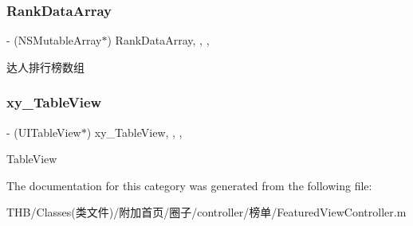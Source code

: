\subsubsection{\texorpdfstring{Rank\+Data\+Array}{RankDataArray}}
{\footnotesize\ttfamily -\/ (N\+S\+Mutable\+Array$\ast$) Rank\+Data\+Array\hspace{0.3cm}{\ttfamily [read]}, {\ttfamily [write]}, {\ttfamily [nonatomic]}, {\ttfamily [strong]}}

达人排行榜数组 \mbox{\label{category_featured_view_controller_07_08_ae5287b78b9131b8d773127ba13ba395a}} 
\subsubsection{\texorpdfstring{xy\+\_\+\+Table\+View}{xy\_TableView}}
{\footnotesize\ttfamily -\/ (U\+I\+Table\+View$\ast$) xy\+\_\+\+Table\+View\hspace{0.3cm}{\ttfamily [read]}, {\ttfamily [write]}, {\ttfamily [nonatomic]}, {\ttfamily [strong]}}

Table\+View 

The documentation for this category was generated from the following file\+:\begin{DoxyCompactItemize}
\item 
T\+H\+B/\+Classes(类文件)/附加首页/圈子/controller/榜单/Featured\+View\+Controller.\+m\end{DoxyCompactItemize}

